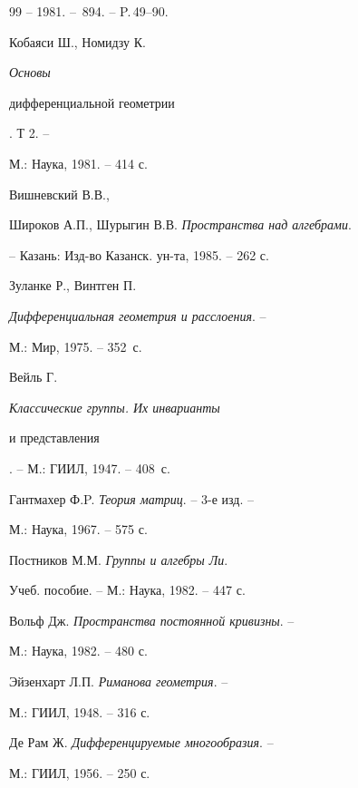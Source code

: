 \begin{thebibliography}{99}
-- 1981. -- \No\,894. -- P.\,49--90.





 Кобаяси Ш., Номидзу К. {\em Основы


дифференциальной геометрии}. Т 2. -- 


М.: Наука, 1981. -- 414 с.





 Вишневский В.В.,


Широков А.П., Шурыгин В.В. {\em Пространства над алгебрами}.


-- Казань: Изд-во Казанск. ун-та, 1985. -- 262 с.





 Зуланке Р., Винтген П.


{\em Дифференциальная геометрия и расслоения}. --


М.: Мир, 1975. -- 352~с.





 Вейль Г. {\em Классические группы. Их инварианты


и представления}. -- М.: ГИИЛ, 1947. -- 408~с.





 Гантмахер Ф.P. {\em Теория матриц}. -- 3-е изд. --


М.: Наука, 1967. -- 575 с.





 Постников М.М. {\em Группы и алгебры Ли}.


Учеб. пособие. -- М.: Наука, 1982. -- 447 с.





 Вольф Дж. {\em Пространства постоянной кривизны}. --


М.: Наука, 1982. -- 480 с.





 Эйзенхарт Л.П. {\em Риманова геометрия}. --


М.: ГИИЛ, 1948. -- 316 с.





 Де Рам Ж. {\em Дифференцируемые многообразия}. -- 


М.: ГИИЛ, 1956. -- 250 с.






\end{thebibliography}
